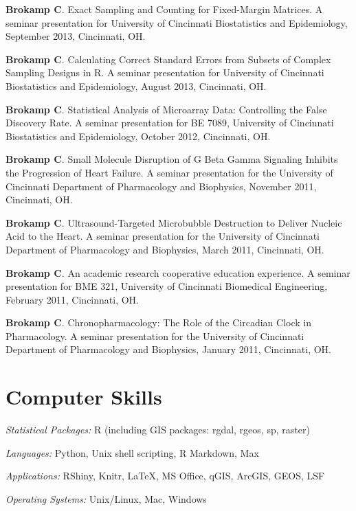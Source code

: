 \documentclass[margin,line]{res}
\newenvironment{list3}{
  \begin{list}{}{%
      \setlength{\itemsep}{0in}
      \setlength{\parsep}{0in} \setlength{\parskip}{0in}
      \setlength{\topsep}{0in} \setlength{\partopsep}{0in} 
      \setlength{\leftmargin}{0in}}}{\end{list}}
\begin{document}
\begin{resume}
\begin{list3}
\item[] \textbf{Brokamp C}. Exact Sampling and Counting for Fixed-Margin Matrices.  A seminar presentation for University of Cincinnati Biostatistics and Epidemiology, September 2013, Cincinnati, OH.
\item[] \textbf{Brokamp C}. Calculating Correct Standard Errors from Subsets of Complex Sampling Designs in R.  A seminar presentation for University of Cincinnati Biostatistics and Epidemiology, August 2013, Cincinnati, OH.
\item[] \textbf{Brokamp C}. Statistical Analysis of Microarray Data: Controlling the False Discovery Rate.  A seminar presentation for BE 7089, University of Cincinnati Biostatistics and Epidemiology, October 2012, Cincinnati, OH.
\item[] \textbf{Brokamp C}. Small Molecule Disruption of G Beta Gamma Signaling Inhibits the Progression of Heart Failure.  A seminar presentation for the University of Cincinnati Department of Pharmacology and Biophysics, November 2011, Cincinnati, OH.
\item[] \textbf{Brokamp C}. Ultrasound-Targeted Microbubble Destruction to Deliver Nucleic Acid to the Heart.  A seminar presentation for the University of Cincinnati Department of Pharmacology and Biophysics, March 2011, Cincinnati, OH.
\item[] \textbf{Brokamp C}. An academic research cooperative education experience. A seminar presentation for BME 321, University of Cincinnati Biomedical Engineering, February 2011, Cincinnati, OH.
\item[] \textbf{Brokamp C}. Chronopharmacology: The Role of the Circadian Clock in Pharmacology.  A seminar presentation for the University of Cincinnati Department of Pharmacology and Biophysics, January 2011, Cincinnati, OH.
\end{list3}



\section{\sc Computer Skills} 

\begin{list3} \itemsep 4pt
\item[] \textit{Statistical Packages:}  R (including GIS packages: rgdal, rgeos, sp, raster)
\item[] \textit{Languages:} Python, Unix shell scripting, R Markdown, Max
\item[] \textit{Applications:} RShiny, Knitr, \LaTeX, MS Office, qGIS, ArcGIS, GEOS, LSF 
\item[] \textit{Operating Systems:}  Unix/Linux, Mac, Windows\\ 
\end{list3}


\end{resume}
\end{document}

